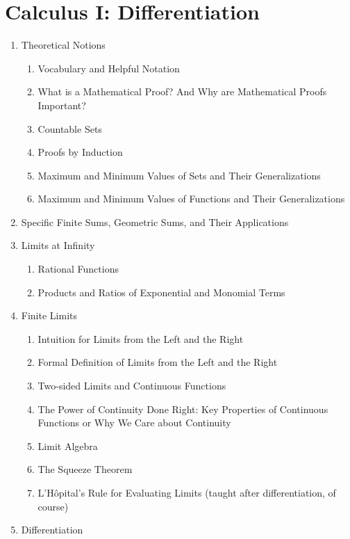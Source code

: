 \section*{Calculus I: Differentiation}
\begin{enumerate}
  \item Theoretical Notions
  \begin{enumerate}
    \item Vocabulary and Helpful Notation 
    \item What is a Mathematical Proof? And Why are Mathematical Proofs Important? 
    \item Countable Sets
  \item Proofs by Induction
     \item Maximum and Minimum Values of Sets and Their Generalizations 
  \item Maximum and Minimum Values of Functions and Their Generalizations
    \end{enumerate}
  \item Specific Finite Sums, Geometric Sums, and Their Applications 
   \item Limits at Infinity
\begin{enumerate}
 \item Rational Functions
  \item Products and Ratios of Exponential and Monomial Terms 
  \end{enumerate}
  \item Finite Limits
  \begin{enumerate}
    \item Intuition for Limits from the Left and the Right 
  \item Formal Definition of Limits from the Left and the Right 
  \item Two-sided Limits and Continuous Functions 
     \item The Power of Continuity Done Right: Key Properties of Continuous Functions or Why We Care about Continuity 
    \item Limit Algebra 

   \item The Squeeze Theorem 

 \item L’Hôpital’s Rule for Evaluating Limits (taught after differentiation, of course)

\end{enumerate}


\item Differentiation
\begin{enumerate}
 

\end{enumerate}
\end{enumerate}
